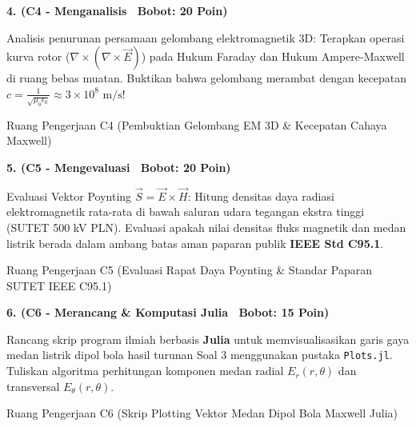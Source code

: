 \documentclass[10pt,a4paper]{article}
\begin{document}
\newpage

\noindent\textbf{4. (C4 - Menganalisis \textbar\ Bobot: 20 Poin)}\par\vspace{0.5mm}
{\footnotesize Analisis penurunan persamaan gelombang elektromagnetik 3D: Terapkan operasi kurva rotor ($\nabla \times (\nabla \times \vec{E})$) pada Hukum Faraday dan Hukum Ampere-Maxwell di ruang bebas muatan. Buktikan bahwa gelombang merambat dengan kecepatan $c = \frac{1}{\sqrt{\mu_0 \epsilon_0}} \approx 3 \times 10^8\text{ m/s}$!}
\begin{answerbox}{Ruang Pengerjaan C4 (Pembuktian Gelombang EM 3D \& Kecepatan Cahaya Maxwell)}
  \vspace{3.8cm}
\end{answerbox}

\vspace{1.5mm}

\noindent\textbf{5. (C5 - Mengevaluasi \textbar\ Bobot: 20 Poin)}\par\vspace{0.5mm}
{\footnotesize Evaluasi Vektor Poynting $\vec{S} = \vec{E} \times \vec{H}$: Hitung densitas daya radiasi elektromagnetik rata-rata di bawah saluran udara tegangan ekstra tinggi (SUTET 500 kV PLN). Evaluasi apakah nilai densitas fluks magnetik dan medan listrik berada dalam ambang batas aman paparan publik \textbf{IEEE Std C95.1}.}
\begin{answerbox}{Ruang Pengerjaan C5 (Evaluasi Rapat Daya Poynting \& Standar Paparan SUTET IEEE C95.1)}
  \vspace{3.8cm}
\end{answerbox}

\vspace{1.5mm}

\noindent\textbf{6. (C6 - Merancang \& Komputasi Julia \textbar\ Bobot: 15 Poin)}\par\vspace{0.5mm}
{\footnotesize Rancang skrip program ilmiah berbasis \textbf{Julia} untuk memvisualisasikan garis gaya medan listrik dipol bola hasil turunan Soal 3 menggunakan pustaka \texttt{Plots.jl}. Tuliskan algoritma perhitungan komponen medan radial $E_r(r,\theta)$ dan transversal $E_\theta(r,\theta)$.}
\begin{answerbox}{Ruang Pengerjaan C6 (Skrip Plotting Vektor Medan Dipol Bola Maxwell Julia)}
  \vspace{3.8cm}
\end{answerbox}
\end{document}
